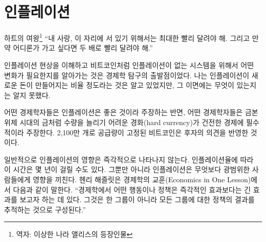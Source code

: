 \chapter{인플레이션}
\label{les:9}

\begin{chapquote}{하트의 여왕\footnote{역자: 이상한 나라 앨리스의 등장인물}} 
	\enquote{내 사랑, 이 자리에 서 있기 위해서는 최대한 빨리 달려야 해. 그리고 만약 어디론가 가고 싶다면
		두 배로 빨리 달려야 해.}
\end{chapquote}

인플레이션 현상을 이해하고 
비트코인처럼 인플레이션이 없는 시스템을 위해서
어떤 변화가 필요한지를 알아가는 것은 경제학 탐구의 출발점이었다. 
나는 인플레이션이 새로운 돈이 만들어지는 비율 정도라는 것은 알고 있었지만,
그 이면에는 무엇이 있는지는 알지 못했다.

어떤 경제학자들은 인플레이션은 좋은 것이라 주장하는 반면, 
어떤 경제학자들은 금본위제 시대의 금처럼 
수량을 늘리기 어려운 경화(hard currency)가 건전한 경제에 필수적이라 주장한다. 
2,100만 개로 공급량이 고정된 비트코인은 후자의 의견을 반영한 것이다.

일반적으로 인플레이션의 영향은 즉각적으로 나타나지 않는다. 
인플레이션율에 따라 이 시간은 몇 년이 걸릴 수도 있다. 
그뿐만 아니라 인플레이션은 무엇보다 광범위한 사람들에게 영향을 끼친다. 
헨리 해즐릿은 경제학의 교훈(Economics in One Lesson)에서 다음과 같이 말한다. 
\enquote{경제학에서 어떤 행동이나 정책은 즉각적인 효과보다는 긴 효과를 보고자 하는 데 있다.
	그것은 한 그룹이 아니라 모든 그룹에 대한 정책의 결과를 추적하는 것으로 구성된다.}


